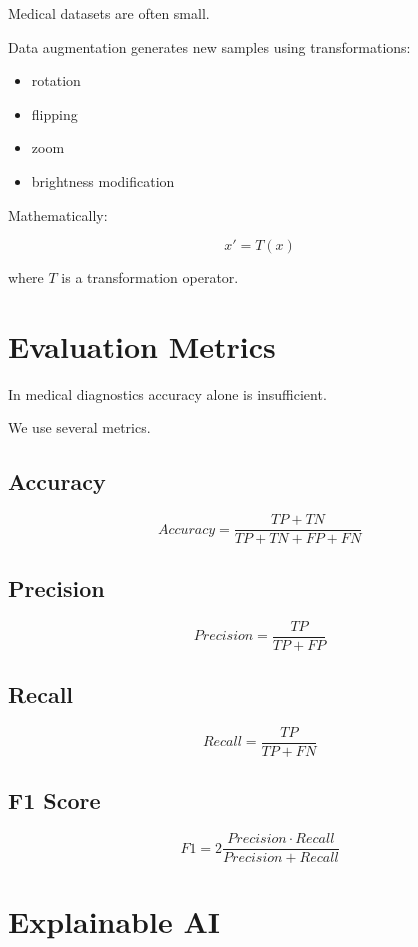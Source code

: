 ﻿\documentclass[11pt]{article}
\begin{document}
Medical datasets are often small.

Data augmentation generates new samples using transformations:

\begin{itemize}
\item rotation
\item flipping
\item zoom
\item brightness modification
\end{itemize}

Mathematically:

\[
x' = T(x)
\]

where $T$ is a transformation operator.

\section{Evaluation Metrics}

In medical diagnostics accuracy alone is insufficient.

We use several metrics.

\subsection{Accuracy}

\[
Accuracy =
\frac{TP + TN}{TP + TN + FP + FN}
\]

\subsection{Precision}

\[
Precision =
\frac{TP}{TP + FP}
\]

\subsection{Recall}

\[
Recall =
\frac{TP}{TP + FN}
\]

\subsection{F1 Score}

\[
F1 =
2
\frac{Precision \cdot Recall}
{Precision + Recall}
\]

\section{Explainable AI}
\end{document}
